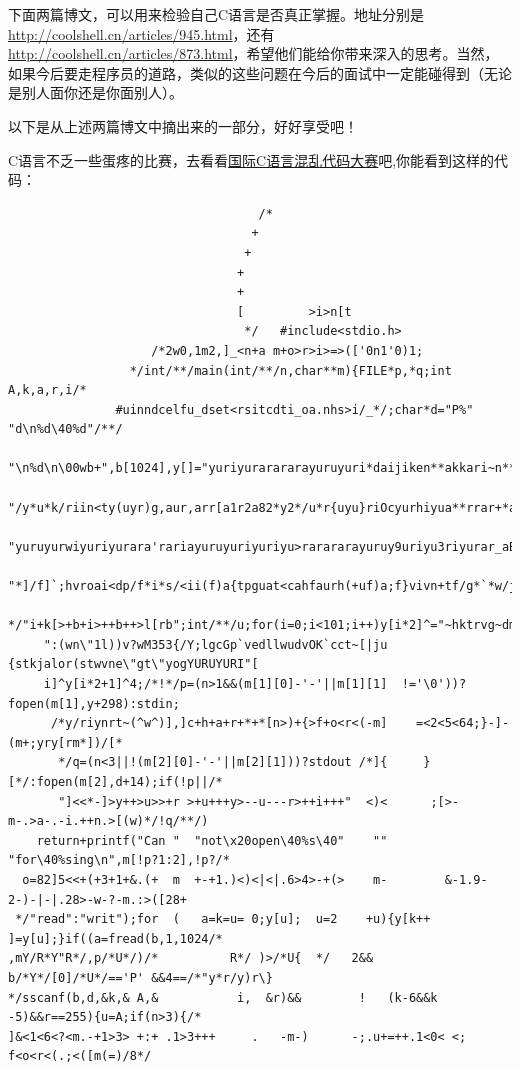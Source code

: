 \documentclass[a4paper]{book}
\begin{document}
下面两篇博文，可以用来检验自己C语言是否真正掌握。地址分别是\url{http://coolshell.cn/articles/945.html}，还有\url{http://coolshell.cn/articles/873.html}，希望他们能给你带来深入的思考。当然，如果今后要走程序员的道路，类似的这些问题在今后的面试中一定能碰得到（无论是别人面你还是你面别人）。

以下是从上述两篇博文中摘出来的一部分，好好享受吧！

C语言不乏一些蛋疼的比赛，去看看\href{http://www0.us.ioccc.org/years.html}{国际C语言混乱代码大赛}吧,你能看到这样的代码：

{\footnotesize\begin{shaded}\begin{verbatim}
	                               /*
	                              +
	                             +
	                            +
	                            +
	                            [         >i>n[t
	                             */   #include<stdio.h>
	                /*2w0,1m2,]_<n+a m+o>r>i>=>(['0n1'0)1;
	             */int/**/main(int/**/n,char**m){FILE*p,*q;int        A,k,a,r,i/*
	           #uinndcelfu_dset<rsitcdti_oa.nhs>i/_*/;char*d="P%"   "d\n%d\40%d"/**/
	         "\n%d\n\00wb+",b[1024],y[]="yuriyurarararayuruyuri*daijiken**akkari~n**"
	  "/y*u*k/riin<ty(uyr)g,aur,arr[a1r2a82*y2*/u*r{uyu}riOcyurhiyua**rrar+*arayra*="
       "yuruyurwiyuriyurara'rariayuruyuriyuriyu>rarararayuruy9uriyu3riyurar_aBrMaPrOaWy^?"
      "*]/f]`;hvroai<dp/f*i*s/<ii(f)a{tpguat<cahfaurh(+uf)a;f}vivn+tf/g*`*w/jmaa+i`ni("/**
     */"i+k[>+b+i>++b++>l[rb";int/**/u;for(i=0;i<101;i++)y[i*2]^="~hktrvg~dmG*eoa+%squ#l2"
     ":(wn\"1l))v?wM353{/Y;lgcGp`vedllwudvOK`cct~[|ju {stkjalor(stwvne\"gt\"yogYURUYURI"[
     i]^y[i*2+1]^4;/*!*/p=(n>1&&(m[1][0]-'-'||m[1][1]  !='\0'))?fopen(m[1],y+298):stdin;
      /*y/riynrt~(^w^)],]c+h+a+r+*+*[n>)+{>f+o<r<(-m]    =<2<5<64;}-]-(m+;yry[rm*])/[*
       */q=(n<3||!(m[2][0]-'-'||m[2][1]))?stdout /*]{     }[*/:fopen(m[2],d+14);if(!p||/*
       "]<<*-]>y++>u>>+r >+u+++y>--u---r>++i+++"  <)<      ;[>-m-.>a-.-i.++n.>[(w)*/!q/**/)
    return+printf("Can "  "not\x20open\40%s\40"    ""       "for\40%sing\n",m[!p?1:2],!p?/*
  o=82]5<<+(+3+1+&.(+  m  +-+1.)<)<|<|.6>4>-+(>    m-        &-1.9-2-)-|-|.28>-w-?-m.:>([28+
 */"read":"writ");for  (   a=k=u= 0;y[u];  u=2    +u){y[k++   ]=y[u];}if((a=fread(b,1,1024/*
,mY/R*Y"R*/,p/*U*/)/*          R*/ )>/*U{  */   2&& b/*Y*/[0]/*U*/=='P' &&4==/*"y*r/y)r\}
*/sscanf(b,d,&k,& A,&           i,  &r)&&        !   (k-6&&k -5)&&r==255){u=A;if(n>3){/*
]&<1<6<?<m.-+1>3> +:+ .1>3+++     .   -m-)      -;.u+=++.1<0< <; f<o<r<(.;<([m(=)/8*/

\end{verbatim}
\end{shaded}}
\end{document}
